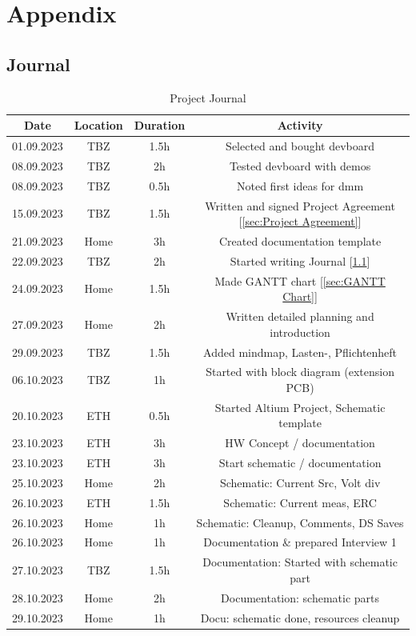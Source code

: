 \chapter{Appendix}\label{cha:Appendix}

\section{Journal}\label{sec:Journal}
\begin{table}[H]
    \centering
    
\begin{tabular}{||c | c | c || c||} 
 \hline
 Date &  Location & Duration & Activity \\ [0.5ex] 
 \hline\hline
  01.09.2023 & TBZ & 1.5h & Selected and bought \acs{devboard} \\ 
 \hline
 08.09.2023 & TBZ & 2h & Tested \acs{devboard} with demos \\ 
 \hline
  08.09.2023 & TBZ & 0.5h & Noted first ideas for \acs{dmm} \\ 
 \hline
   15.09.2023 & TBZ & 1.5h & Written and signed Project Agreement [\ref{sec:Project Agreement}] \\ 
 \hline
    21.09.2023 & Home & 3h & Created documentation template \\ 
 \hline
    22.09.2023 & TBZ & 2h &  Started writing Journal [\ref{sec:Journal}]\\ 
 \hline
    24.09.2023 & Home & 1.5h &  Made GANTT chart [\ref{sec:GANTT Chart}]\\ 
 \hline
    27.09.2023 & Home & 2h & Written detailed planning and introduction \\ 
 \hline
    29.09.2023 & TBZ & 1.5h & Added mindmap, Lasten-, Pflichtenheft \\ 
 \hline
    06.10.2023 & TBZ & 1h & Started with block diagram (extension PCB) \\ 
 \hline
    20.10.2023 & ETH & 0.5h & Started Altium Project, Schematic template \\ 
 \hline
    23.10.2023 & ETH & 3h & HW Concept / documentation \\ 
 \hline
   23.10.2023 & ETH & 3h & Start schematic / documentation \\ 
 \hline
   25.10.2023 & Home & 2h & Schematic: Current Src, Volt div \\ 
 \hline
   26.10.2023 & ETH & 1.5h & Schematic: Current meas, ERC \\ 
 \hline
   26.10.2023 & Home & 1h & Schematic: Cleanup, Comments, DS Saves \\ 
 \hline
   26.10.2023 & Home & 1h & Documentation \& prepared Interview 1 \\ 
 \hline
  27.10.2023 & TBZ & 1.5h & Documentation: Started with schematic part \\ 
 \hline
  28.10.2023 & Home & 2h & Documentation: schematic parts \\ 
 \hline
  29.10.2023 & Home & 1h & Docu: schematic done, resources cleanup \\ 
 \hline
\end{tabular}
    \caption{Project Journal}\label{tab:Project Journal}
\end{table}
\newpage

